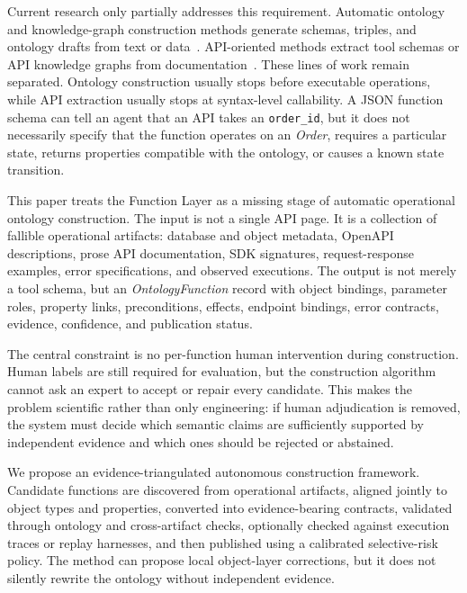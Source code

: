 \documentclass[10pt,twocolumn]{article}
\begin{document}
Current research only partially addresses this requirement. Automatic ontology and knowledge-graph construction methods generate schemas, triples, and ontology drafts from text or data~\cite{kommineni2024human2machine,bai2025autoschemakg,lippolis2025ontogenia}. API-oriented methods extract tool schemas or API knowledge graphs from documentation~\cite{ni2025toolfactory,sun2025apikg,lee2025innout}. These lines of work remain separated. Ontology construction usually stops before executable operations, while API extraction usually stops at syntax-level callability. A JSON function schema can tell an agent that an API takes an \texttt{order\_id}, but it does not necessarily specify that the function operates on an \textit{Order}, requires a particular state, returns properties compatible with the ontology, or causes a known state transition.

This paper treats the Function Layer as a missing stage of automatic operational ontology construction. The input is not a single API page. It is a collection of fallible operational artifacts: database and object metadata, OpenAPI descriptions, prose API documentation, SDK signatures, request-response examples, error specifications, and observed executions. The output is not merely a tool schema, but an \textit{OntologyFunction} record with object bindings, parameter roles, property links, preconditions, effects, endpoint bindings, error contracts, evidence, confidence, and publication status.

The central constraint is no per-function human intervention during construction. Human labels are still required for evaluation, but the construction algorithm cannot ask an expert to accept or repair every candidate. This makes the problem scientific rather than only engineering: if human adjudication is removed, the system must decide which semantic claims are sufficiently supported by independent evidence and which ones should be rejected or abstained.

We propose an evidence-triangulated autonomous construction framework. Candidate functions are discovered from operational artifacts, aligned jointly to object types and properties, converted into evidence-bearing contracts, validated through ontology and cross-artifact checks, optionally checked against execution traces or replay harnesses, and then published using a calibrated selective-risk policy. The method can propose local object-layer corrections, but it does not silently rewrite the ontology without independent evidence.
\end{document}
